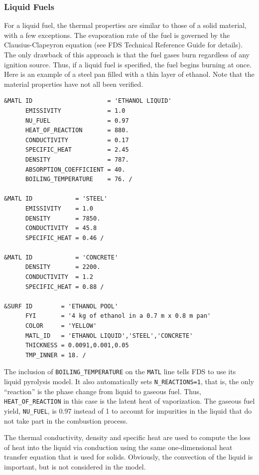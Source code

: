 \documentclass[11pt]{book}
\newcommand{\ct}{\tt\small}
\begin{document}
\subsubsection{Liquid Fuels}

For a liquid fuel, the thermal properties are similar to those of a solid
material, with a few exceptions. The evaporation rate of the fuel
is governed by the Clausius-Clapeyron equation (see FDS Technical Reference
Guide for details). The only drawback of
this approach is that the fuel gases burn regardless of any ignition
source. Thus, if a liquid fuel is specified, the fuel
begins burning at once. Here is an example of a steel pan filled with a thin layer of ethanol. Note that the material
properties have not all been verified.

\footnotesize
\begin{verbatim}
&MATL ID                     = 'ETHANOL LIQUID'
      EMISSIVITY             = 1.0
      NU_FUEL                = 0.97
      HEAT_OF_REACTION       = 880.
      CONDUCTIVITY           = 0.17
      SPECIFIC_HEAT          = 2.45
      DENSITY                = 787.
      ABSORPTION_COEFFICIENT = 40.
      BOILING_TEMPERATURE    = 76. /

&MATL ID            = 'STEEL'
      EMISSIVITY    = 1.0
      DENSITY       = 7850.
      CONDUCTIVITY  = 45.8
      SPECIFIC_HEAT = 0.46 /

&MATL ID            = 'CONCRETE'
      DENSITY       = 2200.
      CONDUCTIVITY  = 1.2
      SPECIFIC_HEAT = 0.88 /

&SURF ID        = 'ETHANOL POOL'
      FYI       = '4 kg of ethanol in a 0.7 m x 0.8 m pan'
      COLOR     = 'YELLOW'
      MATL_ID   = 'ETHANOL LIQUID','STEEL','CONCRETE'
      THICKNESS = 0.0091,0.001,0.05
      TMP_INNER = 18. /
\end{verbatim} \normalsize

\noindent
{}
The inclusion of {\ct BOILING\_TEMPERATURE} on the {\ct MATL} line tells FDS to use its liquid
pyrolysis model. It also automatically sets {\ct N\_REACTIONS=1}, that is, the only ``reaction'' is the
phase change from liquid to gaseous fuel. Thus, {\ct HEAT\_OF\_REACTION} in this case is the latent
heat of vaporization. The gaseous fuel yield, {\ct NU\_FUEL}, is 0.97 instead of 1 to account for
impurities in the liquid that do not take part in the combustion process.

The thermal conductivity, density and specific heat are used
to compute the loss of heat into the liquid via conduction using the
same one-dimensional heat transfer equation that is used for solids. Obviously,
the convection of the liquid is important, but is not considered in
the model.
\end{document}
